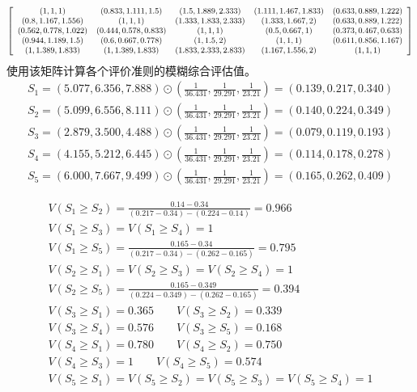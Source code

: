 \documentclass[adobefonts,UTF8]{ctexart}
\begin{document}
\[
\left[
\small
  \begin{array}{ccccc}
    (1,1,1)&(0.833,1.111,1.5)&(1.5,1.889,2.333)&(1.111,1.467,1.833)&(0.633,0.889,1.222)\\
    (0.8,1.167,1.556)&(1,1,1)&(1.333,1.833,2.333)&(1.333,1.667,2)&(0.633,0.889,1.222)\\
    (0.562,0.778,1.022)&(0.444,0.578,0.833)&(1,1,1)&(0.5,0.667,1)&(0.373,0.467,0.633)\\
    (0.944,1.189,1.5)&(0.6,0.667,0.778)&(1,1.5,2)&(1,1,1)&(0.611,0.856,1.167)\\
    (1,1.389,1.833)&(1,1.389,1.833)&(1.833,2.333,2.833)&(1.167,1.556,2)&(1,1,1)\\
  \end{array}
\right]
\]
使用该矩阵计算各个评价准则的模糊综合评估值。
\begin{eqnarray*}
  \label{eq:1}
  S_1 =
(5.077,6.356,7.888)\odot(\frac{1}{36.431},\frac{1}{29.291},\frac{1}{23.21})=(0.139,0.217,0.340)\\
S_2 =
(5.099,6.556,8.111)\odot(\frac{1}{36.431},\frac{1}{29.291},\frac{1}{23.21})=(0.140,0.224,0.349)\\
S_3 =
(2.879,3.500,4.488)\odot(\frac{1}{36.431},\frac{1}{29.291},\frac{1}{23.21})=(0.079,0.119,0.193)\\
S_4
=(4.155,5.212,6.445)\odot(\frac{1}{36.431},\frac{1}{29.291},\frac{1}{23.21})=(0.114,0.178,0.278)\\
S_5 =(6.000,7.667,9.499)\odot(\frac{1}{36.431},\frac{1}{29.291},\frac{1}{23.21})=(0.165,0.262,0.409)
\end{eqnarray*}

\begin{eqnarray*}
  \label{eq:2}
V(S_1\geq S_2)=  \frac{0.14-0.34}{(0.217-0.34)-(0.224-0.14)}=0.966\\
V(S_1\geq S_3)=V(S_1\geq S_4)=1\\
V(S_1\geq S_5)=\frac{0.165-0.34}{(0.217-0.34)-(0.262-0.165)}=0.795\\
V(S_2\geq S_1)=V(S_2\geq S_3)=V(S_2\geq S_4)=1\\
V(S_2\geq S_5)=\frac{0.165-0.349}{(0.224-0.349)-(0.262-0.165)}=0.394\\
V(S_3\geq S_1)=0.365 \qquad
V(S_3\geq S_2)=0.339\\
V(S_3\geq S_4)=0.576 \qquad
V(S_3\geq S_5)=0.168\\
V(S_4\geq S_1)=0.780 \qquad
V(S_4\geq S_2)=0.750\\
V(S_4\geq S_3)=1 \qquad
V(S_4\geq S_5)=0.574\\
V(S_5\geq S_1)=V(S_5\geq S_2)=V(S_5\geq S_3)=V(S_5\geq S_4)=1
\end{eqnarray*}
\end{document}
